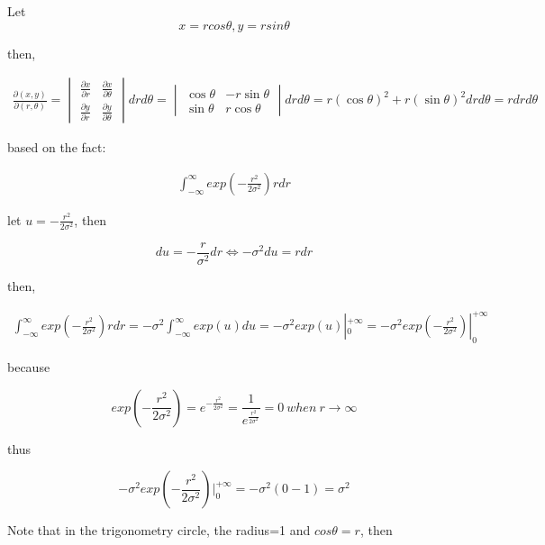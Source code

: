 Let
$$
    x = rcos \theta, y = r sin \theta
$$
 
then,

\begin{align*}
    \frac{\partial(x, y)}{\partial (r, \theta)} = 
    \begin{vmatrix}
        \frac{\partial x}{\partial r} & \frac{\partial x}{\partial \theta}\\
        \frac{\partial y}{\partial r} & \frac{\partial y}{\partial \theta}
    \end{vmatrix}dr d\theta
    =
    \begin{vmatrix}
        \cos \theta & -r\sin \theta\\
        \sin \theta & r \cos \theta
    \end{vmatrix} dr d \theta = 
    r (\cos \theta)^2 + r (\sin \theta)^2drd \theta = rdrd\theta
\end{align*}

based on the fact:

\begin{equation}
    \begin{split}
        \int_{- \infty}^{\infty} exp(-\frac{r^2}{2\sigma^2})rdr
    \end{split}
\end{equation}

let $u = -\frac{r^2}{2\sigma^2}$, then

\begin{equation}
    du = -\frac{r}{\sigma^2}dr \Leftrightarrow -\sigma^2du = rdr
\end{equation}

then,

\begin{equation}
    \begin{split}
        \int_{- \infty}^{\infty} exp(-\frac{r^2}{2\sigma^2})rdr = -\sigma^2\int_{- \infty}^{\infty} exp(u)du = - \sigma^2 exp(u) |_0^{+\infty} = - \sigma^2 exp(-\frac{r^2}{2\sigma^2}) |_0^{+\infty}
    \end{split}
\end{equation}

because

$$
    exp(-\frac{r^2}{2\sigma^2}) = e^{-\frac{r^2}{2\sigma^2}} = \frac{1}{e^{\frac{r^2}{2\sigma^2}}} = 0 \ when\ r \rightarrow \infty
$$

thus

$$
    - \sigma^2 exp(-\frac{r^2}{2\sigma^2}) |_0^{+\infty} = -\sigma^2(0 - 1) = \sigma^2
$$

Note that in the trigonometry circle, the radius=1 and $cos \theta = r$, then


